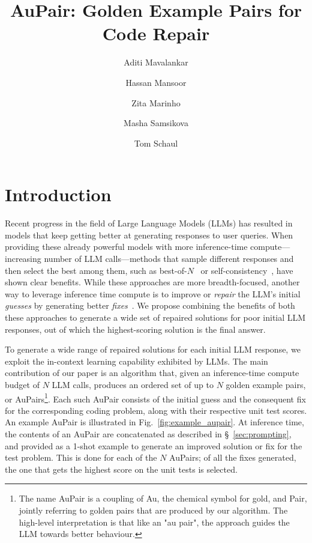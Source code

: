 \documentclass[11pt, a4paper, logo, copyright]{googledeepmind}
\title{\textcolor{golden}{Au}Pair: \textcolor{golden}{Golden} Example Pairs for Code Repair}
\author{Aditi Mavalankar}
\author{Hassan Mansoor}
\author{Zita Marinho}
\author{Masha Samsikova}
\author{Tom Schaul}
\affil[1]{Google DeepMind}
\def\aupair/{\textcolor{golden}{Au}Pair}
\def\aupairs/{\textcolor{golden}{Au}Pairs}
\begin{document}
\maketitle

\section{Introduction}

Recent progress in the field of Large Language Models (LLMs) has resulted in models that keep getting better at generating responses to user queries. When providing these already powerful models with more inference-time compute---increasing number of LLM calls---methods that sample different responses and then select the best among them, such as best-of-$N$~\citep{best-of-n} or self-consistency~\citep{wang2023selfconsistencyimproveschainthought}, have shown clear benefits. While these approaches are more breadth-focused, another way to leverage inference time compute is to improve or \emph{repair} the LLM's initial \emph{guesses} by generating better \emph{fixes}~\citep{olausson2024self}. We propose combining the benefits of both these approaches to generate a wide set of repaired solutions for poor initial LLM responses, out of which the highest-scoring solution is the final answer.

To generate a wide range of repaired solutions for each initial LLM response, we exploit the in-context learning capability exhibited by LLMs. The main contribution of our paper is an algorithm that, given an inference-time compute budget of $N$ LLM calls, produces an ordered set of up to $N$ \textcolor{golden}{golden} example pairs, or \aupairs/\footnote{The name \aupair/ is a coupling of \textcolor{golden}{Au}, the chemical symbol for gold, and Pair, jointly referring to \textcolor{golden}{golden} pairs that are produced by our algorithm. The high-level interpretation is that like an "au pair", the approach guides the LLM towards better behaviour.}. Each such \aupair/ consists of the initial guess and the consequent fix for the corresponding coding problem, along with their respective unit test scores. An example \aupair/ is illustrated in Fig.~\ref{fig:example_aupair}. At inference time, the contents of an \aupair/ are concatenated as described in \S~\ref{sec:prompting}, and provided as a 1-shot example to generate an improved solution or fix for the test problem. This is done for each of the $N$ \aupairs/; of all the fixes generated, the one that gets the highest score on the unit tests is selected.
\end{document}
